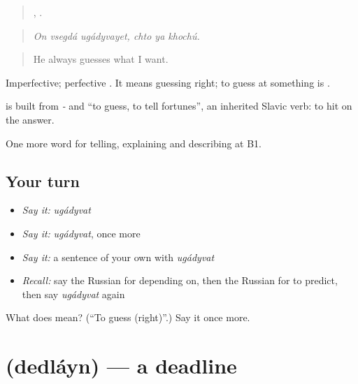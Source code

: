 \begin{quote}
  ,   .
\end{quote}

\begin{quote}
\emph{On vsegdá ugádyvayet, chto ya khochú.}
\end{quote}

\begin{quote}
He always guesses what I want.
\end{quote}

Imperfective; perfective \emph{}. It means guessing right; to guess at something is \emph{}.

\begin{cousinweb}
\textbf{} is built from \emph{-} and \emph{} \textquotedblleft{}to guess, to tell fortunes\textquotedblright{}, an inherited Slavic verb: to hit on the answer.
\end{cousinweb}

\begin{grammarlens}[title={What you've built}]
One more word for telling, explaining and describing at B1.
\end{grammarlens}

\subsection*{Your turn}
\begin{itemize}
\raggedright
  \item \emph{Say it:} \emph{ugádyvat}
  \item \emph{Say it:} \emph{ugádyvat}, once more
  \item \emph{Say it:} a sentence of your own with \emph{ugádyvat}
  \item \emph{Recall:} say the Russian for depending on, then the Russian for to predict, then say \emph{ugádyvat} again
\end{itemize}

\begin{tcolorbox}[breakable,colback=teal!4,colframe=teal!35!black,title={Before you move on}]
What does  mean? (\textquotedblleft{}To guess (right)\textquotedblright{}.) Say it once more.
\end{tcolorbox}
\section[\texorpdfstring{\ru{дедлайн} (dedláyn)}{дедлайн (dedláyn)}]{ (dedláyn) — a deadline}

